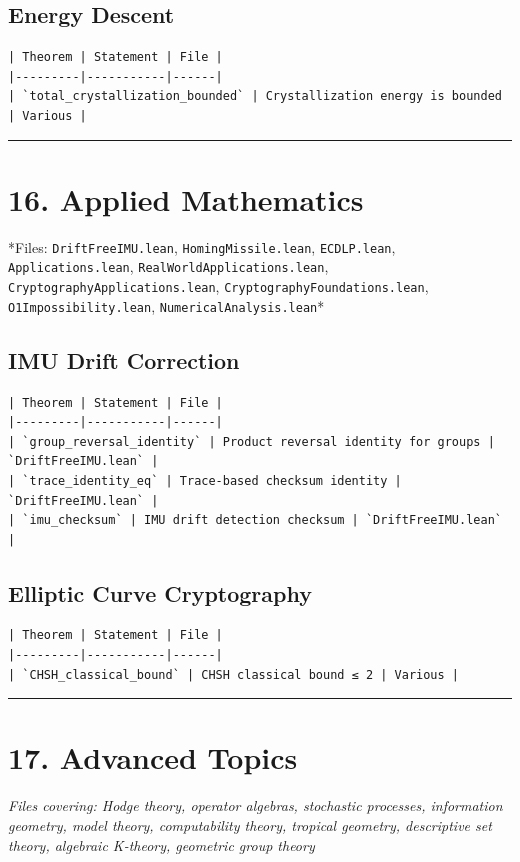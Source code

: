 \documentclass[12pt,a4paper,openany]{book}
\begin{document}
\subsection{Energy Descent}
\begin{verbatim}
| Theorem | Statement | File |
|---------|-----------|------|
| `total_crystallization_bounded` | Crystallization energy is bounded | Various |
\end{verbatim}

\bigskip\hrule\bigskip

\section{16. Applied Mathematics}

*Files: \texttt{DriftFreeIMU.lean}, \texttt{HomingMissile.lean}, \texttt{ECDLP.lean}, \texttt{Applications.lean}, \texttt{RealWorldApplications.lean}, \texttt{CryptographyApplications.lean}, \texttt{CryptographyFoundations.lean}, \texttt{O1Impossibility.lean}, \texttt{NumericalAnalysis.lean}*

\subsection{IMU Drift Correction}
\begin{verbatim}
| Theorem | Statement | File |
|---------|-----------|------|
| `group_reversal_identity` | Product reversal identity for groups | `DriftFreeIMU.lean` |
| `trace_identity_eq` | Trace-based checksum identity | `DriftFreeIMU.lean` |
| `imu_checksum` | IMU drift detection checksum | `DriftFreeIMU.lean` |
\end{verbatim}

\subsection{Elliptic Curve Cryptography}
\begin{verbatim}
| Theorem | Statement | File |
|---------|-----------|------|
| `CHSH_classical_bound` | CHSH classical bound ≤ 2 | Various |
\end{verbatim}

\bigskip\hrule\bigskip

\section{17. Advanced Topics}

\textit{Files covering: Hodge theory, operator algebras, stochastic processes, information geometry, model theory, computability theory, tropical geometry, descriptive set theory, algebraic K-theory, geometric group theory}
\end{document}
